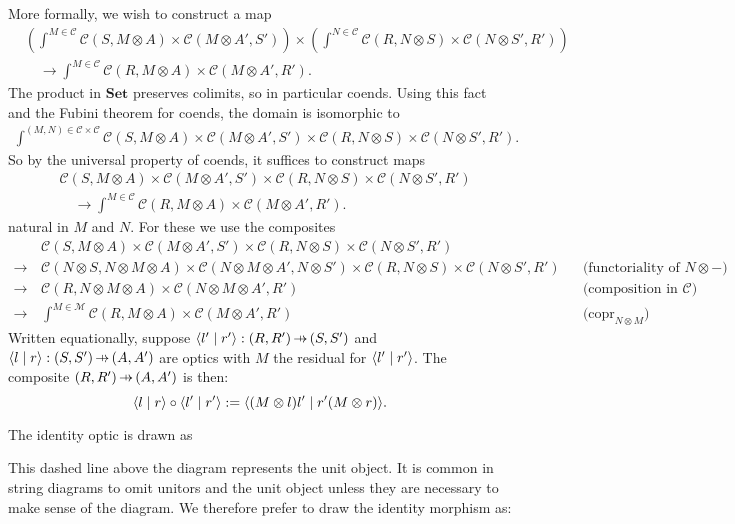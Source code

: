 \documentclass[11pt,letterpaper]{article}
\theoremstyle{plain}
\theoremstyle{definition}
\newcommand{\C}{\mathscr{C}}
\newcommand{\M}{\mathscr{M}}
\newcommand{\Set}{\mathbf{Set}}
\DeclareMathOperator{\copr}{copr}
\newcommand{\rep}[2]{{\ensuremath \left\langle #1 \mid #2 \right\rangle}}
\newcommand{\hto}{\ensuremath{\,\mathaccent\shortmid\rightarrow\,}}
\begin{document}
More formally, we wish to construct a map
\begin{align*}
  &\left(\int^{M \in \C} \C(S, M \otimes A) \times \C(M \otimes A', S')\right) \times \left(\int^{N \in \C} \C(R, N \otimes S) \times \C(N \otimes S', R')\right) \\ 
  &\quad \to \int^{M \in \C} \C(R, M \otimes A) \times \C(M \otimes A', R').
\end{align*}
The product in $\Set$ preserves colimits, so in particular coends. Using this fact and the Fubini theorem for coends, the domain is isomorphic to
\begin{align*}
  \int^{(M, N) \in \C \times \C} \C(S, M \otimes A) \times \C(M \otimes A', S') \times \C(R, N \otimes S) \times \C(N \otimes S', R').
\end{align*}
So by the universal property of coends, it suffices to construct maps
\begin{align*}
  & \C(S, M \otimes A) \times \C(M \otimes A', S') \times \C(R, N \otimes S) \times \C(N \otimes S', R') \\ &
                                                                                                              \quad \to \int^{M \in \C} \C(R, M \otimes A) \times \C(M \otimes A', R').
\end{align*}
natural in $M$ and $N$. For these we use the composites
\begin{align*}
  &\C(S, M \otimes A) \times \C(M \otimes A', S') \times \C(R, N \otimes S) \times \C(N \otimes S', R')\\
  \to \,& \C(N \otimes S, N \otimes M \otimes A) \times \C(N \otimes M \otimes A', N \otimes S') \times \C(R, N \otimes S) \times \C(N \otimes S', R') && \text{(functoriality of $N \otimes  -$)} \\
  \to \,& \C(R, N \otimes  M \otimes A) \times \C(N \otimes M \otimes A', R') && \text{(composition in $\C$)} \\
  \to \,&\int^{M \in \M} \C(R, M \otimes A) \times \C(M \otimes A', R') && \text{($\copr_{N \otimes M}$)}
\end{align*}
Written equationally, suppose $\rep{l'}{r'} : (R, R') \hto (S, S')$ and $\rep{l}{r} : (S, S') \hto (A, A')$ are optics with $M$ the residual for $\rep{l'}{r'}$. The composite $(R, R') \hto (A, A')$ is then: \[\rep{l}{r} \circ \rep{l'}{r'} := \rep{(M \otimes l)l'}{r'(M \otimes r)}.\]

The identity optic is drawn as
\begin{center}
  
\end{center}
This dashed line above the diagram represents the unit object. It is common in string diagrams to omit unitors and the unit object unless they are necessary to make sense of the diagram. We therefore prefer to draw the identity morphism as:
\begin{center}
  
\end{center}
\end{document}
